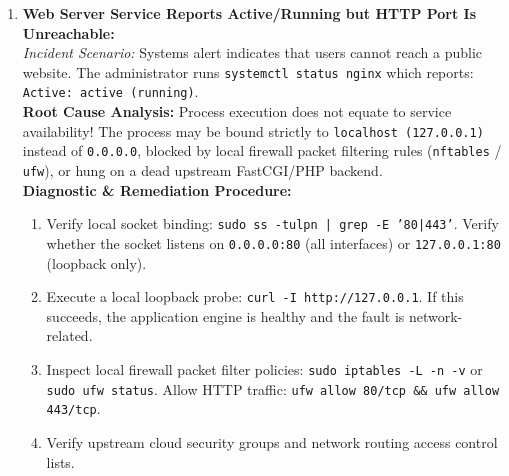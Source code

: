 \begin{enumerate}[label=\textbf{Case \arabic*.},leftmargin=1.5cm]
\item \textbf{Web Server Service Reports Active/Running but HTTP Port Is Unreachable:} \\
\textit{Incident Scenario:} Systems alert indicates that users cannot reach a public website. The administrator runs \texttt{systemctl status nginx} which reports: \texttt{Active: active (running)}. \\
\textbf{Root Cause Analysis:} Process execution does not equate to service availability! The process may be bound strictly to \texttt{localhost (127.0.0.1)} instead of \texttt{0.0.0.0}, blocked by local firewall packet filtering rules (\texttt{nftables} / \texttt{ufw}), or hung on a dead upstream FastCGI/PHP backend. \\
\textbf{Diagnostic \& Remediation Procedure:}
\begin{enumerate}
    \item Verify local socket binding: \texttt{sudo ss -tulpn | grep -E '80|443'}. Verify whether the socket listens on \texttt{0.0.0.0:80} (all interfaces) or \texttt{127.0.0.1:80} (loopback only).
    \item Execute a local loopback probe: \texttt{curl -I http://127.0.0.1}. If this succeeds, the application engine is healthy and the fault is network-related.
    \item Inspect local firewall packet filter policies: \texttt{sudo iptables -L -n -v} or \texttt{sudo ufw status}. Allow HTTP traffic: \texttt{ufw allow 80/tcp \&\& ufw allow 443/tcp}.
    \item Verify upstream cloud security groups and network routing access control lists.
\end{enumerate}


\end{enumerate}
